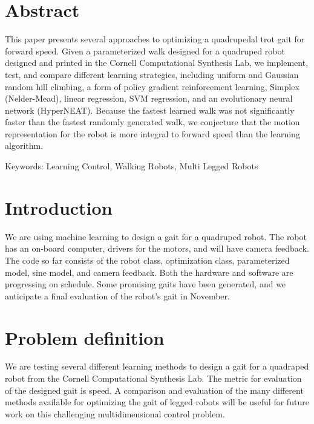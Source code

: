 \section{Abstract}
This paper presents several approaches to optimizing a quadrupedal
trot gait for forward speed. Given a parameterized walk designed for
a quadruped robot designed and printed in the Cornell Computational
Synthesis Lab, we implement, test, and compare different learning strategies, 
including uniform and Gaussian random hill climbing, a form of policy 
gradient reinforcement learning\cite{1}, Simplex (Nelder-Mead), 
linear regression, SVM regression, and an evolutionary neural 
network (HyperNEAT)\cite{2}. Because the fastest learned walk was not
significantly faster than the fastest randomly generated walk, we
conjecture that the motion representation for the robot is more
integral to forward speed than the learning algorithm.

Keywords: Learning Control, Walking Robots, Multi Legged Robots

\section{Introduction}
We are using machine learning to design a gait for a quadruped
robot. The robot has an on-board computer, drivers for the motors, and
will have camera feedback. The code so far consists of the robot
class, optimization class, parameterized model, sine model, and camera
feedback.  Both the hardware and software are progressing on schedule.
Some promising gaits have been generated, and we anticipate a final
evaluation of the robot’s gait in November.
  
\section{Problem definition}
We are testing several different learning methods to design a gait for 
a quadraped robot from the Cornell Computational Synthesis Lab. The metric 
for evaluation of the designed gait is speed. A comparison and evaluation 
of the many different methods available for optimizing the gait of legged 
robots will be useful for future work on this challenging multidimensional 
control problem.

